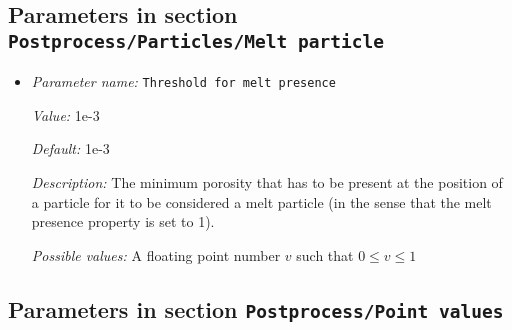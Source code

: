 \subsection{Parameters in section \tt Postprocess/Particles/Melt particle}
\label{parameters:Postprocess/Particles/Melt_20particle}

\begin{itemize}
\item {\it Parameter name:} {\tt Threshold for melt presence}
\label{parameters:Postprocess/Particles/Melt particle/Threshold for melt presence}


{\it Value:} 1e-3


{\it Default:} 1e-3


{\it Description:} The minimum porosity that has to be present at the position of a particle for it to be considered a melt particle (in the sense that the melt presence property is set to 1).


{\it Possible values:} A floating point number $v$ such that $0 \leq v \leq 1$
\end{itemize}

\subsection{Parameters in section \tt Postprocess/Point values}
\label{parameters:Postprocess/Point_20values}

